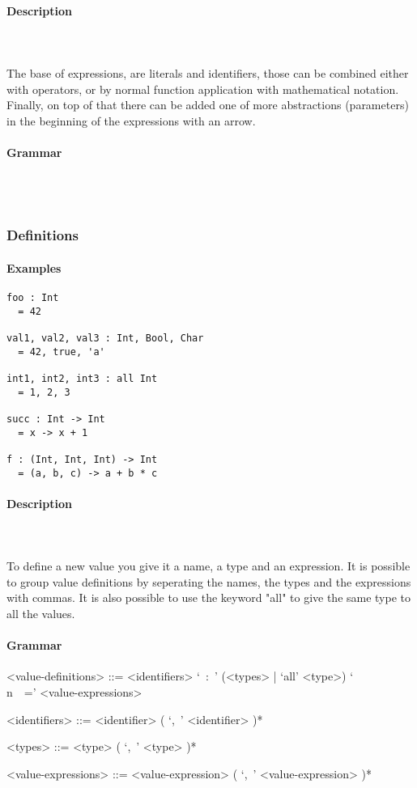 \documentclass{article}
\def\pend{\mbox{} \\\\}
\begin{document}
\paragraph{Description}\pend
The base of expressions, are literals and identifiers, those can be combined either
with operators, or by normal function application with mathematical notation. 
Finally, on top of that there can be added one of more abstractions (parameters)
in the beginning of the expressions with an arrow.

\paragraph{Grammar}\pend

\subsubsection{Definitions}

\paragraph{Examples}

\begin{verbatim}
foo : Int
  = 42

val1, val2, val3 : Int, Bool, Char
  = 42, true, 'a'

int1, int2, int3 : all Int
  = 1, 2, 3

succ : Int -> Int
  = x -> x + 1

f : (Int, Int, Int) -> Int
  = (a, b, c) -> a + b * c
\end{verbatim}

\paragraph{Description}\pend
To define a new value you give it a name, a type and an expression. It is possible
to group value definitions by seperating the names, the types and the expressions
with commas. It is also possible to use the keyword "all" to give the same type
to all the values.

\paragraph{Grammar}
\begin{grammar}
<value-definitions> ::=
<identifiers> `\ :\ ' (<types> | `all' <type>) `\\n\ \ =' <value-expressions>

<identifiers> ::= <identifier> ( `,\ ' <identifier> )*  

<types> ::= <type> ( `,\ ' <type> )*  

<value-expressions> ::= <value-expression> ( `,\ ' <value-expression> )*  
\end{grammar}
\end{document}
